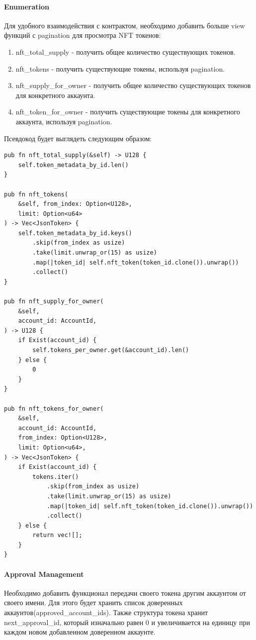 \paragraph{Enumeration}
Для удобного взаимодействия с контрактом, необходимо добавить больше view функций с pagination для просмотра NFT токенов\cite{enumstandard}:
\begin{enumerate}
\item nft\_total\_supply - получить общее количество существующих токенов.
\item nft\_tokens - получить существующие токены, используя pagination.
\item nft\_supply\_for\_owner - получить общее количество существующих токенов для конкретного аккаунта.
\item nft\_token\_for\_owner - получить существующие токены для конкретного аккаунта, используя pagination.
\end{enumerate}

Псевдокод будет выглядеть следующим образом:

\begin{verbatim}
pub fn nft_total_supply(&self) -> U128 {
    self.token_metadata_by_id.len()
}

pub fn nft_tokens(
    &self, from_index: Option<U128>,
    limit: Option<u64>
) -> Vec<JsonToken> {
    self.token_metadata_by_id.keys()
        .skip(from_index as usize)
        .take(limit.unwrap_or(15) as usize)
        .map(|token_id| self.nft_token(token_id.clone()).unwrap())
        .collect()
}

pub fn nft_supply_for_owner(
    &self,
    account_id: AccountId,
) -> U128 {
    if Exist(account_id) {
        self.tokens_per_owner.get(&account_id).len()
    } else {
        0
    }
}

pub fn nft_tokens_for_owner(
    &self,
    account_id: AccountId,
    from_index: Option<U128>,
    limit: Option<u64>,
) -> Vec<JsonToken> {
    if Exist(account_id) {
        tokens.iter()
            .skip(from_index as usize)
            .take(limit.unwrap_or(15) as usize)
            .map(|token_id| self.nft_token(token_id.clone()).unwrap())
            .collect()
    } else {
        return vec![];
    }
}
\end{verbatim}

\paragraph{Approval Management}
Необходимо добавить функционал передачи своего токена другим аккаунтом от своего имени\cite{approvalstandard}. Для этого будет хранить список доверенных аккаунтов(approved\_account\_ids).
Также структура токена хранит next\_approval\_id, который изначально равен 0 и увеличивается на единицу при каждом новом добавленном доверенном аккаунте.

